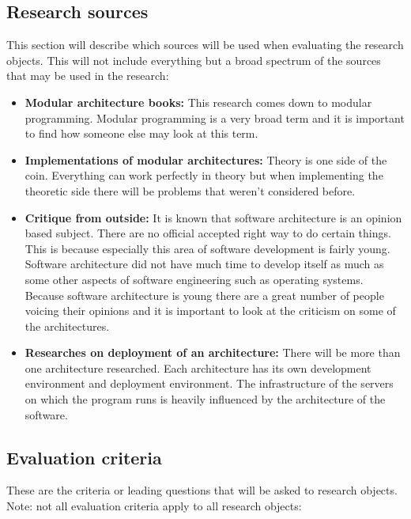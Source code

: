 \subsection{Research sources}
This section will describe which sources will be used when evaluating the research objects. This will not include everything but a broad spectrum of the sources that may be used in the research:

\begin{itemize}
	\item \textbf{Modular architecture books: }This research comes down to modular programming. Modular programming is a very broad term and it is important to find how someone else may look at this term.

	\item \textbf{Implementations of modular architectures: }Theory is one side of the coin. Everything can work perfectly in theory but when implementing the theoretic side there will be problems that weren't considered before.

	\item \textbf{Critique from outside: }It is known that software architecture is an opinion based subject. There are no official accepted right way to do certain things. This is because especially this area of software development is fairly young. Software architecture did not have much time to develop itself as much as some other aspects of software engineering such as operating systems. Because software architecture is young there are a great number of people voicing their opinions and it is important to look at the criticism on some of the architectures.

	\item \textbf{Researches on deployment of an architecture: } There will be more than one architecture researched. Each architecture has its own development environment and deployment environment. The infrastructure of the servers on which the program runs is heavily influenced by the architecture of the software.
\end{itemize}

\subsection{Evaluation criteria}
These are the criteria or leading questions that will be asked to research objects. Note: not all evaluation criteria apply to all research objects:

